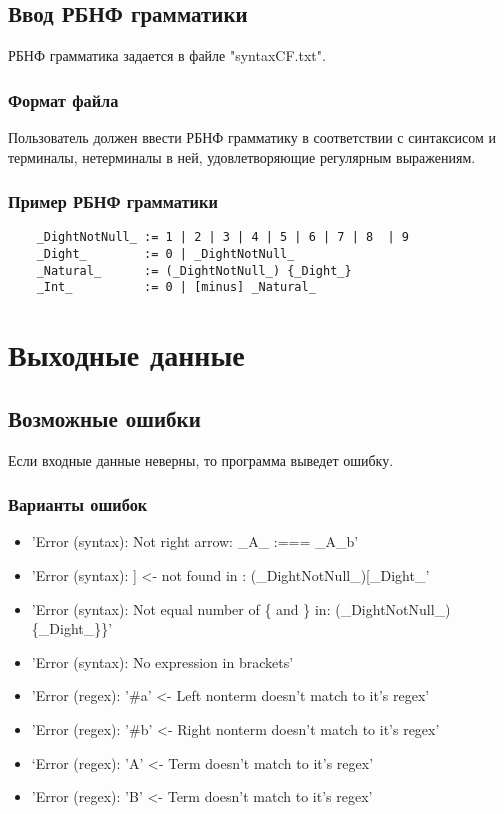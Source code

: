 \documentclass[12pt]{article}
\begin{document}


    \hfill
    \subsection{Ввод РБНФ грамматики}

    РБНФ грамматика задается в файле "syntaxCF.txt".

    \subsubsection*{Формат файла}
    Пользователь должен ввести РБНФ грамматику в соответствии с синтаксисом и терминалы, нетерминалы в ней, удовлетворяющие регулярным выражениям.

    \subsubsection*{Пример РБНФ грамматики}
    \begin{lstlisting}
    _DightNotNull_ := 1 | 2 | 3 | 4 | 5 | 6 | 7 | 8  | 9
    _Dight_        := 0 | _DightNotNull_
    _Natural_      := (_DightNotNull_) {_Dight_}
    _Int_          := 0 | [minus] _Natural_
    \end{lstlisting}

    \clearpage


    \section{Выходные данные}

    \subsection{Возможные ошибки}

    Если входные данные неверны, то программа выведет ошибку.

    \subsubsection*{Варианты ошибок}
    \begin{itemize}
        \item 'Error (syntax): Not right arrow: \_A\_ :=== \_A\_b'
        \item 'Error (syntax): ] <- not found in : (\_DightNotNull\_)[\_Dight\_'
        \item 'Error (syntax): Not equal number of \{ and \}   in: (\_DightNotNull\_)\{\_Dight\_\}\}'
        \item 'Error (syntax): No expression in brackets'
        \item 'Error (regex): '\#a' <- Left nonterm doesn't match to it's regex'
        \item 'Error (regex): '\#b' <- Right nonterm doesn't match to it's regex'
        \item ‘Error (regex): 'A' <- Term doesn't match to it's regex’
        \item 'Error (regex): 'B' <- Term doesn't match to it's regex'
    \end{itemize}
\end{document}
